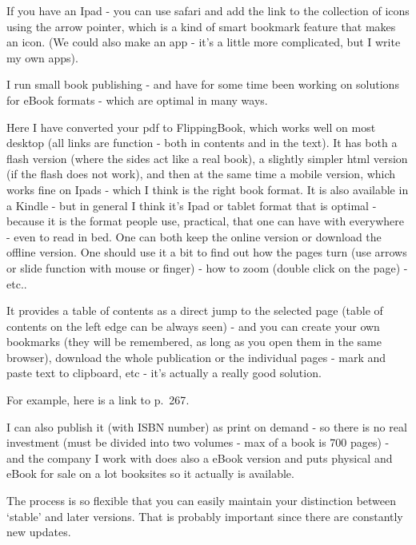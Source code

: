 If you have an Ipad - you can use safari and add the link to the
collection of icons using the arrow pointer, which is a kind of smart
bookmark feature that makes an icon. (We could also make an app - it's a
little more complicated, but I write my own apps).

I run small book publishing - and have for some time been working on
solutions for eBook formats - which are optimal in many ways.

Here I have converted your pdf to FlippingBook, which works well on most
desktop (all links are function - both in contents and in the
text). It has both a flash version (where the sides act like a real book),
a slightly  simpler html version (if the flash does not work), and
then at the same time a mobile version, which works fine on
Ipads - which I think is the right book format. It is also available in a
Kindle - but in general I think it's Ipad or tablet format that is
optimal - because it is the format people use, practical, that one
can have with everywhere - even to read in bed. One can both keep the
online version or download the offline version. One should use it a
bit to find out how the pages turn (use arrows or slide function with
mouse or finger) - how to zoom (double click on the page) - etc..

It provides a table of contents as a direct jump to the selected page
(table of contents on the left edge can be always seen) - and you can
create your own bookmarks (they will be remembered, as long as you open
them in the same browser), download the whole publication or the
individual pages - mark and paste text to clipboard, etc - it's actually
a really good solution.

For example, here is a link to
 {p.~267}.

I can also publish it (with ISBN number) as print
on demand - so there is no real investment (must be divided into two
volumes - max of a book is 700 pages) - and the company I work with does
also a eBook version and puts physical and eBook for sale on a lot
booksites so it actually is available.

The process is so flexible that you can easily maintain your distinction
between `stable' and later versions. That is probably important since
there are constantly new updates.

